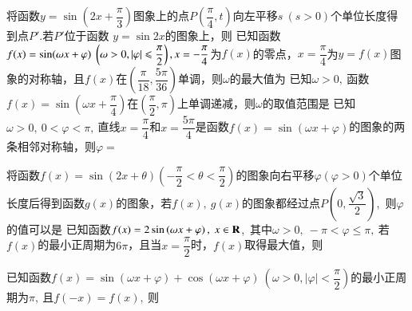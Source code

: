 \documentclass{BHCexam}
\begin{document}
\begin{questions}
\qs 将函数$ y=\sin\left(2x+\dfrac{\pi}{3}\right) $图象上的点$ P\left(\dfrac{\pi}{4},t\right) $向左平移$ s~(s>0) $个单位长度得到点$ P' $.若$ P' $位于函数 $ y=\sin 2x $的图象上，则\xx
{}
\question 已知函数$f(x)=\sin(\omega x+\varphi)~\left(\omega>0,\left| \varphi \right|\leqslant \dfrac{\pi}{2}\right),x=-\dfrac{\pi}{4}$为$f(x)$的零点，$x=\dfrac{\pi}{4}$为$y=f(x)$图象的对称轴，且$f(x)$在$\left(\dfrac{\pi}{18},\dfrac{5\pi}{36}\right)$单调，则$\omega$的最大值为\xx
{}
\qs 已知$ \omega>0,~ $函数$f(x)=\sin (\omega x+\dfrac{\pi}{4})$在$\left(\dfrac{\pi}{2},\pi\right)  $上单调递减，则$ \omega $的取值范围是\xx
\onech{$ \left[\dfrac{1}{2},\dfrac{5}{4}\right] $}{$ \left[\dfrac{1}{2},\dfrac{3}{4}\right] $}{$ \left(0,\dfrac{1}{2}\right] $}{$ \left(0,2\right] $}
\qs 已知$ \omega>0,~0<\varphi <\pi,~ $直线$ x=\dfrac{\pi}{4} $和$ x=\dfrac{5\pi}{4} $是函数$f(x)=\sin (\omega x+\varphi)$的图象的两条相邻对称轴，则$ \varphi= $\xx
{}

\qs 将函数$f(x)=\sin (2x+\theta)\left(-\dfrac{\pi}{2}<\theta<\dfrac{\pi}{2}\right)$的图象向右平移$ \varphi(\varphi>0) $个单位长度后得到函数$g(x)$的图象，若$f(x),~g(x)$的图象都经过点$ P\left(0,\dfrac{\sqrt{3}}{2}\right) $,~则$ \varphi $的值可以是\xx
{}
\qs 已知函数$f(x)=2\sin \left(\omega x+\varphi\right),~x \in\mathbf{R}$,~其中$ \omega>0,~-\pi <\varphi\le \pi ,~ $若$f(x)$的最小正周期为$ 6\pi  $，且当$ x=\dfrac{\pi}{2} $时，$f(x)$取得最大值，则\xx
{}

\qs 已知函数$f(x)=\sin (\omega x +\varphi)+\cos (\omega x+\varphi)~\left(\omega>0,\left|\varphi\right|<\dfrac{\pi}{2}\right)$的最小正周期为$ \pi ,~ $且$ f(-x)=f(x),~ $则\xx
{}



\end{questions}
\end{document}
